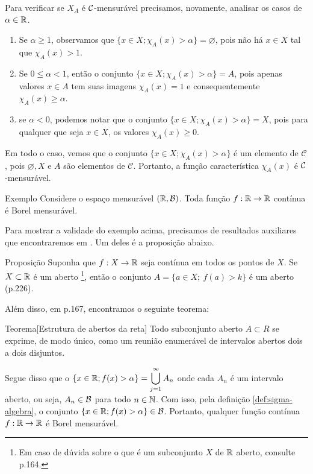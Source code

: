 Para verificar se $X_A$ é $\operatorname{\mathcal{C}}$-mensurável precisamos, novamente, analisar os casos de $\alpha \in \mathbb{R}$.
	\begin{enumerate}[label*= (\Roman*)]
		\item Se $\alpha \geq 1$, observamos que $\{x \in X; \chi_A(x)>  \alpha\} = \varnothing$, pois não há $x \in X$ tal que $\chi_A(x) > 1$.  
		\item Se $ 0 \leq \alpha < 1$, então o conjunto $\{x \in X; \chi_A(x)>  \alpha\} = A$, pois apenas valores $x \in A$ tem suas imagens $\chi_A(x) = 1$ e consequentemente $\chi_A(x) \geq \alpha$.
		\item  se $\alpha < 0$, podemos notar que o conjunto $\{x \in X; \chi_A(x)>  \alpha\} = X$, pois para qualquer que seja $x \in X$, os valores $\chi_A(x) \geq 0$.
	\end{enumerate}
Em todo o caso, vemos que o conjunto $\{x \in X; \chi_A(x)>  \alpha\}$ é um elemento de $\mathcal{C}$, pois $\varnothing, X$ e $A$ são elementos de $\mathcal{C}$. Portanto, a função característica $\chi_A(x)$ é $\operatorname{\mathcal{C}}$-mensurável.
\begin{resultado}{Exemplo}
\label{ex:função-continua-mensuravel}
    Considere o espaço mensurável $(\mathbb{R}, \operatorname{\mathcal{B}})$. Toda função $f: \mathbb{R} \to \mathbb{R}$ contínua é Borel mensurável.
\end{resultado}
	Para mostrar a validade do exemplo acima, precisamos de resultados auxiliares que encontraremos em \cite{elon}.
	Um deles é a proposição abaixo.
\begin{resultado}{Proposição}
\label{cit:função-continua-mensuravel}
	Suponha que $f:X \to \mathbb{R}$ seja contínua em todos os pontos de $X$.
	Se $X \subset \mathbb{R}$ é um aberto
	\footnote{Em caso de dúvida sobre o que é um subconjunto $X$ de $\mathbb{R}$ aberto, consulte \supercite{elon}{p.164}.}, então o conjunto $A = \{a \in X;\ f(a)>k\}$ é um aberto (p.226).
\end{resultado}

	Além disso, em \supercite{elon}{p.167}, encontramos o seguinte teorema:
	
	\begin{resultado}{Teorema}[Estrutura de abertos da reta]
		\label{teo:estrutura-abertos-reta}
		Todo subconjunto aberto $A \subset R$ se exprime, de modo único, como um reunião enumerável de intervalos abertos dois a dois disjuntos.
	\end{resultado}
	
	Segue disso que o
	$\{x \in \mathbb{R}; f(x) > \alpha\} = \displaystyle \bigcup_{j = 1}^\infty A_n$ onde cada $A_n$ é um intervalo aberto, ou seja, $A_n \in \operatorname{\mathcal{B}}$ para todo $n \in \operatorname{\mathbb{N}}$.
	Com isso, pela definição \ref{def:sigma-algebra}, o conjunto $\{x \in \mathbb{R}; f(x) > \alpha\} \in \operatorname{\mathcal{B}}$.
	Portanto, qualquer função contínua $f: \mathbb{R} \to \mathbb{R}$ é Borel mensurável.


